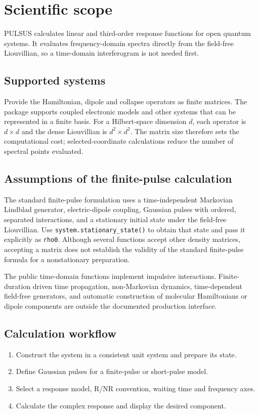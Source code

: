 \section{Scientific scope}
\label{sec:introduction}

PULSUS calculates linear and third-order response functions for open
quantum systems. It evaluates frequency-domain spectra directly from the
field-free Liouvillian, so a time-domain interferogram is not needed first.

\subsection{Supported systems}
Provide the Hamiltonian, dipole and collapse operators as finite matrices.
The package supports coupled electronic models and other systems that can
be represented in a finite basis. For a Hilbert-space dimension $d$, each
operator is $d\times d$ and the dense Liouvillian is $d^2\times d^2$.
The matrix size therefore sets the computational cost; selected-coordinate
calculations reduce the number of spectral points evaluated.

\subsection{Assumptions of the finite-pulse calculation}
The standard finite-pulse formulation uses a time-independent Markovian
Lindblad generator, electric-dipole coupling, Gaussian pulses with ordered,
separated interactions, and a stationary initial state under the field-free
Liouvillian. Use \texttt{system.stationary\_state()} to obtain that state and
pass it explicitly as \texttt{rho0}. Although several functions accept
other density matrices, accepting a matrix does not establish the validity
of the standard finite-pulse formula for a nonstationary preparation.

The public time-domain functions implement impulsive interactions.
Finite-duration driven time propagation, non-Markovian dynamics,
time-dependent field-free generators, and automatic construction of
molecular Hamiltonians or dipole components are outside the documented
production interface.

\subsection{Calculation workflow}
\begin{enumerate}
\item Construct the system in a consistent unit system and prepare its state.
\item Define Gaussian pulses for a finite-pulse or short-pulse model.
\item Select a response model, R/NR convention, waiting time and frequency axes.
\item Calculate the complex response and display the desired component.
\end{enumerate}
